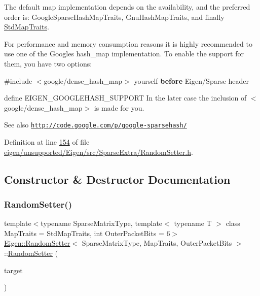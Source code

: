 The default map implementation depends on the availability, and the preferred order is\+: Google\+Sparse\+Hash\+Map\+Traits, Gnu\+Hash\+Map\+Traits, and finally \hyperlink{struct_eigen_1_1_std_map_traits}{Std\+Map\+Traits}.

For performance and memory consumption reasons it is highly recommended to use one of the Google\textquotesingle{}s hash\+\_\+map implementation. To enable the support for them, you have two options\+:
\begin{DoxyItemize}
\item \#include $<$google/dense\+\_\+hash\+\_\+map$>$ yourself {\bfseries before} Eigen/\+Sparse header
\item define E\+I\+G\+E\+N\+\_\+\+G\+O\+O\+G\+L\+E\+H\+A\+S\+H\+\_\+\+S\+U\+P\+P\+O\+RT In the later case the inclusion of $<$google/dense\+\_\+hash\+\_\+map$>$ is made for you.
\end{DoxyItemize}

\begin{DoxySeeAlso}{See also}
\href{http://code.google.com/p/google-sparsehash/}{\tt http\+://code.\+google.\+com/p/google-\/sparsehash/} 
\end{DoxySeeAlso}


Definition at line \hyperlink{eigen_2unsupported_2_eigen_2src_2_sparse_extra_2_random_setter_8h_source_l00154}{154} of file \hyperlink{eigen_2unsupported_2_eigen_2src_2_sparse_extra_2_random_setter_8h_source}{eigen/unsupported/\+Eigen/src/\+Sparse\+Extra/\+Random\+Setter.\+h}.



\subsection{Constructor \& Destructor Documentation}
\mbox{\label{class_eigen_1_1_random_setter_a62e960bd52cec62a59ebb285f381138f}} 
\subsubsection{\texorpdfstring{Random\+Setter()}{RandomSetter()}\hspace{0.1cm}{\footnotesize\ttfamily [1/2]}}
{\footnotesize\ttfamily template$<$typename Sparse\+Matrix\+Type, template$<$ typename T $>$ class Map\+Traits = Std\+Map\+Traits, int Outer\+Packet\+Bits = 6$>$ \\
\hyperlink{class_eigen_1_1_random_setter}{Eigen\+::\+Random\+Setter}$<$ Sparse\+Matrix\+Type, Map\+Traits, Outer\+Packet\+Bits $>$\+::\hyperlink{class_eigen_1_1_random_setter}{Random\+Setter} (\begin{DoxyParamCaption}\item[{Sparse\+Matrix\+Type \&}]{target }\end{DoxyParamCaption})\hspace{0.3cm}{\ttfamily [inline]}}

